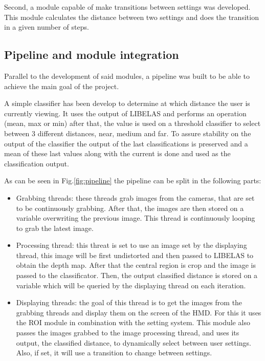 \documentclass[10pt,a4paper,twocolumn,twoside]{article}
\begin{document}
	Second, a module capable of make transitions between settings was developed. This module calculates the distance between two settings and does the transition in a given number of steps. 
	
	\subsection{Pipeline and module integration}
	\label{sec:pipeline}
	
	Parallel to the development of said modules, a pipeline was built to be able to achieve the main goal of the project.
	
	A simple classifier has been develop to determine at which distance the user is currently viewing. It uses the output of LIBELAS and performs an operation (mean, max or min) after that, the value is used on a threshold classifier to select between 3 different distances, near, medium and far. To assure stability on the output of the classifier the output of the last classifications is preserved and a mean of these last values along with the current is done and used as the classification output.  
	
	As can be seen in Fig.\ref{fig:pipeline} the pipeline can be split in the following parts: 
	
	\begin{itemize}
		\item Grabbing threads: these threads grab images from the cameras, that are set to be continuously grabbing. After that, the images are then stored on a variable overwriting the previous image. This thread is continuously looping to grab the latest image. 
		
		\item Processing thread: this threat is set to use an image set by the displaying thread, this image will be first undistorted and then passed to LIBELAS to obtain the depth map. After that the central region is crop and the image is passed to the classificator. Then, the output classified distance is stored on a variable which will be queried by the displaying thread on each iteration.  
		
		\item Displaying threads: the goal of this thread is to get the images from the grabbing threads and display them on the screen of the HMD. For this it uses the ROI module in combination with the setting system. This module also passes the images grabbed to the image processing thread, and uses its output, the classified distance, to dynamically select between user settings. Also, if set, it will use a transition to change between settings. 
		
	\end{itemize}
	
\end{document}
